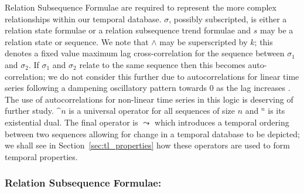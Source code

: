 Relation Subsequence Formulae are required to represent the more
complex relationships within our temporal database. $\sigma$, possibly
subscripted, is either a relation state formulae or a relation
subsequence trend formulae and $s$ may be a relation state or
sequence. We note that $\wedge$ may be superscripted by $k$; this
denotes a fixed value maximum lag cross-correlation for the sequence
between $\sigma_1$ and $\sigma_2$. If $\sigma_1$ and $\sigma_2$ relate
to the same sequence then this becomes auto-correlation; we do not
consider this further due to autocorrelations for linear time series
following a dampening oscillatory pattern towards 0 as the lag
increases \cite{end95}. The use of autocorrelations for non-linear
time series in this logic is deserving of further study. $\bm^n$ is a
universal operator for all sequences of size $n$ and \diam$^n$ is its
existential dual. The final operator is $\leadsto$ which introduces a
temporal ordering between two sequences allowing for change in a
temporal database to be depicted; we shall see in
Section~\ref{sec:tl_properties} how these operators are used to form
temporal properties.

\subsubsection{Relation Subsequence Formulae:}

